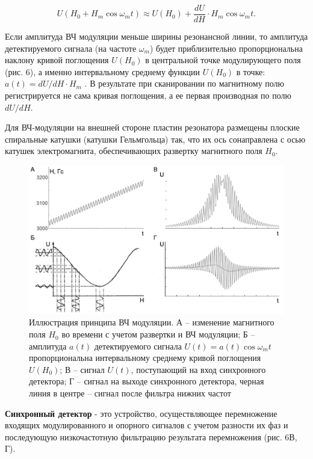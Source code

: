 \documentclass[a4paper,14pt]{article}
\begin{document}
\begin{equation}
	U(H_0 + H_m \cos{\omega_m t}) \approx U(H_0) + \frac{dU}{dH} \cdot H_m \cos{\omega_m t}.
\end{equation}
\par 
Если амплитуда ВЧ модуляции меньше ширины резонансной линии, то амплитуда детектируемого сигнала (на частоте $ \omega_m $) будет приблизительно пропорциональна наклону кривой поглощения $ U(H_0) $ в центральной точке модулирующего поля (рис. 6), а именно интервальному среднему функции $ U(H_0) $ в точке: $ a(t)=dU/dH \cdot H_m $ . В результате при сканировании по магнитному полю регистрируется не сама кривая поглощения, а ее первая производная по полю $ dU/dH $.
\par 
Для ВЧ-модуляции на внешней стороне пластин резонатора размещены плоские спиральные катушки (катушки Гельмгольца) так, что их ось сонаправлена с осью катушек электромагнита, обеспечивающих развертку магнитного поля $ H_0 $.
\begin{figure}
	\centering
	\includegraphics[scale=0.7]{рис6}
	\caption{Иллюстрация принципа ВЧ модуляции. А – изменение магнитного поля $ H_0 $ во времени с учетом развертки и ВЧ модуляции; Б – амплитуда $ a(t) $ детектируемого сигнала $ U(t)=a(t)\cos{\omega_m t} $ пропорциональна интервальному среднему кривой поглощения $ U(H_0) $; В – сигнал $ U(t) $, поступающий на вход синхронного детектора; Г – сигнал на выходе синхронного детектора, черная линия в центре – сигнал после фильтра нижних частот}
	\label{fig:6}
\end{figure}
\par 
\textbf{Синхронный детектор} - это устройство, осуществляющее перемножение входящих модулированного и опорного сигналов с учетом разности их фаз и последующую низкочастотную фильтрацию результата перемножения (рис. 6В, Г). 
\end{document}
